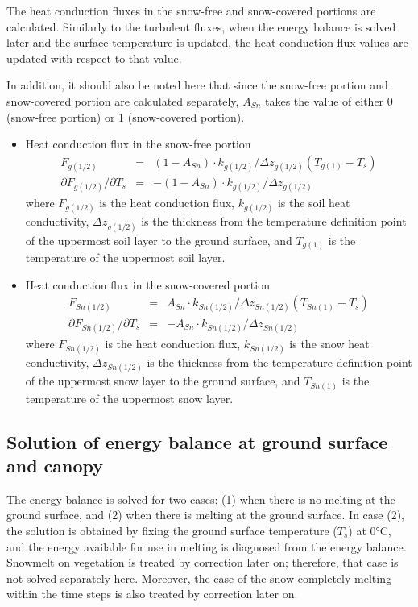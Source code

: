 The heat conduction fluxes in the snow-free and snow-covered portions are calculated. Similarly to the turbulent fluxes, when the energy balance is solved later and the surface temperature is updated,
the heat conduction flux values are updated with respect to that value.

In addition, it should also be noted here that since the snow-free portion and snow-covered portion are calculated separately, \(A_{Sn}\) takes the value of either 0 (snow-free portion) or 1
(snow-covered portion).

\begin{itemize}
\item
  Heat conduction flux in the snow-free portion \begin{eqnarray}
  F_{g(1/2)} &=& (1 - A_{Sn}) \cdot k_{g(1/2)} / \Delta z_{g(1/2)} (T_{g(1)} - T_s) \\
  \partial F_{g(1/2)}/\partial T_s &=&
  - (1 - A_{Sn}) \cdot k_{g(1/2)} / \Delta z_{g(1/2)}
  \end{eqnarray} where \(F_{g(1/2)}\) is the heat conduction flux, \(k_{g(1/2)}\) is the soil heat conductivity, \(\Delta z_{g(1/2)}\) is the thickness from the temperature definition point of the uppermost soil
  layer to the ground surface, and \(T_{g(1)}\) is the temperature of the uppermost soil layer.
\item
  Heat conduction flux in the snow-covered portion　 \begin{eqnarray}
  F_{Sn(1/2)} &=& A_{Sn} \cdot k_{Sn(1/2)} / \Delta z_{Sn(1/2)} (T_{Sn(1)} - T_s)
   \\
  \partial F_{Sn(1/2)}/\partial T_s &=&
  - A_{Sn} \cdot k_{Sn(1/2)} / \Delta z_{Sn(1/2)} \label{eq135}
  \end{eqnarray} where \(F_{Sn(1/2)}\) is the heat conduction flux, \(k_{Sn(1/2)}\) is the snow heat conductivity, \(\Delta z_{Sn(1/2)}\) is the thickness from the temperature definition point of the uppermost
  snow layer to the ground surface, and \(T_{Sn(1)}\) is the temperature of the uppermost snow layer.
\end{itemize}

\subsection{Solution of energy balance at ground surface and canopy}\label{solution-of-energy-balance-at-ground-surface-and-canopy}

The energy balance is solved for two cases: (1) when there is no melting at the ground surface, and (2) when there is melting at the ground surface. In case (2), the solution is obtained by fixing the
ground surface temperature (\(T_s\)) at 0°C, and the energy available for use in melting is diagnosed from the energy balance. Snowmelt on vegetation is treated by correction later on; therefore, that
case is not solved separately here. Moreover, the case of the snow completely melting within the time steps is also treated by correction later on.

